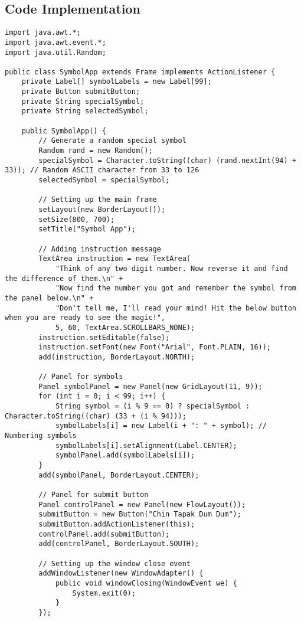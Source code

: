 \subsection{Code Implementation}
\begin{verbatim}
import java.awt.*;
import java.awt.event.*;
import java.util.Random;

public class SymbolApp extends Frame implements ActionListener {
    private Label[] symbolLabels = new Label[99];
    private Button submitButton;
    private String specialSymbol;
    private String selectedSymbol;

    public SymbolApp() {
        // Generate a random special symbol
        Random rand = new Random();
        specialSymbol = Character.toString((char) (rand.nextInt(94) + 33)); // Random ASCII character from 33 to 126
        selectedSymbol = specialSymbol;

        // Setting up the main frame
        setLayout(new BorderLayout());
        setSize(800, 700);
        setTitle("Symbol App");

        // Adding instruction message
        TextArea instruction = new TextArea(
            "Think of any two digit number. Now reverse it and find the difference of them.\n" +
            "Now find the number you got and remember the symbol from the panel below.\n" +
            "Don't tell me, I'll read your mind! Hit the below button when you are ready to see the magic!",
            5, 60, TextArea.SCROLLBARS_NONE);
        instruction.setEditable(false);
        instruction.setFont(new Font("Arial", Font.PLAIN, 16));
        add(instruction, BorderLayout.NORTH);

        // Panel for symbols
        Panel symbolPanel = new Panel(new GridLayout(11, 9));
        for (int i = 0; i < 99; i++) {
            String symbol = (i % 9 == 0) ? specialSymbol : Character.toString((char) (33 + (i % 94)));
            symbolLabels[i] = new Label(i + ": " + symbol); // Numbering symbols
            symbolLabels[i].setAlignment(Label.CENTER);
            symbolPanel.add(symbolLabels[i]);
        }
        add(symbolPanel, BorderLayout.CENTER);

        // Panel for submit button
        Panel controlPanel = new Panel(new FlowLayout());
        submitButton = new Button("Chin Tapak Dum Dum");
        submitButton.addActionListener(this);
        controlPanel.add(submitButton);
        add(controlPanel, BorderLayout.SOUTH);

        // Setting up the window close event
        addWindowListener(new WindowAdapter() {
            public void windowClosing(WindowEvent we) {
                System.exit(0);
            }
        });


\end{verbatim}
